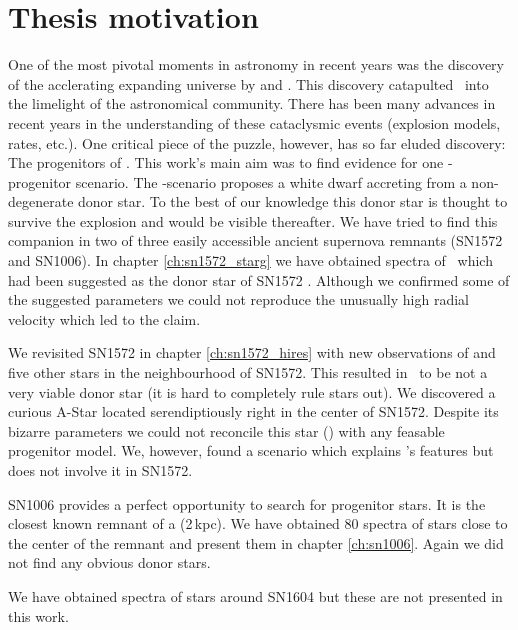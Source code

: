 \section{Thesis motivation}
One of the most pivotal moments in astronomy in recent years was the discovery of the acclerating expanding universe by \citet{1998AJ....116.1009R} and \citet{1999ApJ...517..565P}. This discovery catapulted \sneia\ into the limelight of the astronomical community. There has been many advances in recent years in the understanding of these cataclysmic events (explosion models, rates, etc.). One critical piece of the puzzle, however, has so far eluded discovery: The progenitors of \sneia. This work's main aim was to find evidence for one \snia-progenitor scenario. The \sd-scenario proposes a white dwarf accreting from a non-degenerate donor star. To the best of our knowledge this donor star is thought to survive the explosion and would be visible thereafter. We have tried to find this companion in two of three easily accessible ancient supernova remnants (SN1572 and SN1006). 
In chapter \ref{ch:sn1572_starg} we have obtained spectra of \starg\ which had been suggested as the donor star of SN1572 \citep{2004Natur.431.1069R}. Although we confirmed some of the suggested parameters we could not reproduce the unusually high radial velocity which led to the claim. 

We revisited SN1572 in chapter \ref{ch:sn1572_hires} with new observations of \starg and five other stars in the neighbourhood of SN1572. This resulted in \starg\ to be not a very viable donor star (it is hard to completely rule stars out). We discovered a curious A-Star located serendiptiously right in the center of SN1572. Despite its bizarre parameters we could not reconcile this star (\starb) with any feasable progenitor model. We, however, found a scenario which explains \starb's features but does not involve it in SN1572. 

SN1006 provides a perfect opportunity to search for progenitor stars. It is the closest known remnant of a \snia (2\,kpc). We have obtained 80 spectra of stars close to the center of the remnant and present them in chapter \ref{ch:sn1006}. Again we did not find any obvious donor stars. 

We have obtained spectra of stars around SN1604 but these are not presented in this work.

